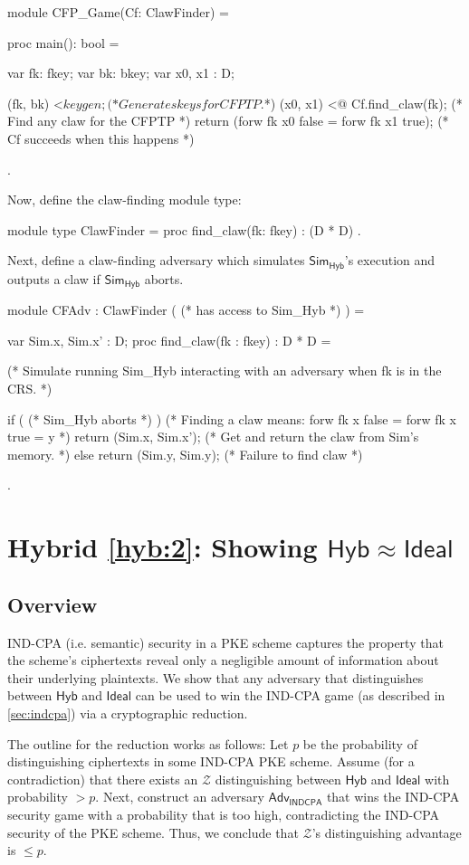 \documentclass{article}[12pt]
\newcommand{\Indcpa}{\mathsf{INDCPA}}
\newcommand{\Sim}{{\mathsf{Sim}}} %
\newcommand{\Adversary}{{\mathsf{Adv}}} %
\newcommand{\Environment}{{\mathcal{Z}}} %
\newcommand{\IndcpaAdversary}{{\Adversary_\Indcpa}}
\newcommand{\Ideal}{{\mathsf{Ideal}}}
\newcommand{\Hyb}{{\mathsf{Hyb}}}
\begin{document}
\begin{easycrypt}
module CFP_Game(Cf: ClawFinder) = {
	proc main(): bool = {
		var fk: fkey; var bk: bkey;
		var x0, x1 : D;

		(fk, bk) <$ keygen;             (* Generates keys for CFPTP. $*)
		(x0, x1) <@ Cf.find_claw(fk);   (* Find any claw for the CFPTP *)
		return (forw fk x0 false = forw fk x1 true); (* Cf succeeds when this happens *)
	}
}.
\end{easycrypt}

Now, define the claw-finding module type:

\begin{easycrypt}
module type ClawFinder = {
  proc find_claw(fk: fkey) : (D * D)
}.
\end{easycrypt}

Next, define a claw-finding adversary which simulates $\Sim_\Hyb$'s execution and outputs a claw if $\Sim_\Hyb$ aborts.

\begin{easycrypt}
module CFAdv : ClawFinder ( (* has access to Sim_Hyb *) ) = {
	var Sim.x, Sim.x' : D;
	proc find_claw(fk : fkey) : D * D = {

		(* Simulate running Sim_Hyb interacting with an adversary when fk is in the CRS. *)

		if ( (* Sim_Hyb aborts *) ) {
			(* Finding a claw means: forw fk x false = forw fk x true = y *)
			return (Sim.x, Sim.x'); (* Get and return the claw from Sim's memory. *)
		}
		else {
			return (Sim.y, Sim.y); (* Failure to find claw *)
		}
	}
}.
\end{easycrypt}

\section{Hybrid \ref{hyb:2}: Showing $\Hyb \approx \Ideal$}

\subsection{Overview} \label{sec:indcpa_red_overview}
IND-CPA (i.e. semantic) security in a PKE scheme captures the property that the scheme's ciphertexts reveal only a negligible amount of information about their underlying plaintexts. We show that any adversary that distinguishes between $\Hyb$ and $\Ideal$ can be used to win the IND-CPA game (as described in \cref{sec:indcpa}) via a cryptographic reduction.

The outline for the reduction works as follows: Let $p$ be the probability of distinguishing ciphertexts in some IND-CPA PKE scheme. Assume (for a contradiction) that there exists an $\Environment$ distinguishing between $\Hyb$ and $\Ideal$ with probability $> p$. Next, construct an adversary $\IndcpaAdversary$ that wins the IND-CPA security game with a probability that is too high, contradicting the IND-CPA security of the PKE scheme. Thus, we conclude that $\Environment$'s distinguishing advantage is $\leq p$.
\end{document}
